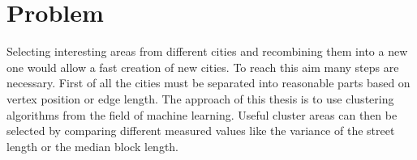 \chapter{Problem}
Selecting interesting areas from different cities and recombining them into a new one would allow a fast creation of new cities. To reach this aim many steps are necessary. First of all the cities must be separated into reasonable parts based on vertex position or edge length. The approach of this thesis is to use clustering algorithms from the field of machine learning. Useful cluster areas can then be selected by comparing different measured values like the variance of the street length or the median block length.